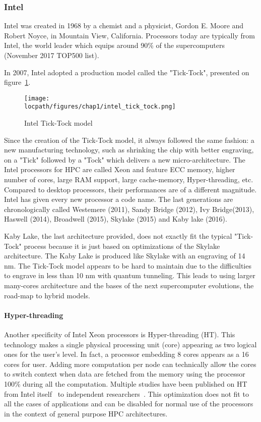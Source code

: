 \subsubsection{Intel}
Intel was created in 1968 by a chemist and a physicist, Gordon E. Moore and Robert Noyce, in Mountain View, California. 
Processors today are typically from Intel, the world leader which equips around 90\% of the supercomputers (November 2017 TOP500 list).

In 2007, Intel adopted a production model called the "Tick-Tock", presented on figure~\ref{fig:1_HPC:intel_tick_tock}.
\begin{figure}[t!]
\begin{center}
\texttt{[image: \\locpath/figures/chap1/intel\_tick\_tock.png]}
\caption{Intel Tick-Tock model}
\label{fig:1_HPC:intel_tick_tock}
\end{center}
\end{figure}
Since the creation of the Tick-Tock model, it always followed the same fashion: a new manufacturing technology, such as shrinking the chip with better engraving, on a "Tick" followed by a "Tock" which delivers a new micro-architecture.
The Intel processors for HPC are called Xeon and feature ECC memory, higher number of cores, large RAM support, large cache-memory, Hyper-threading, etc. 
Compared to desktop processors, their performances are of a different magnitude.
Intel has given every new processor a code name. 
The last generations are chronologically called Westemere (2011), Sandy Bridge (2012), Ivy Bridge(2013), Haswell (2014), Broadwell (2015), Skylake (2015) and Kaby lake (2016). 

Kaby Lake, the last architecture provided, does not exactly fit the typical "Tick-Tock" process because it is just based on optimizations of the Skylake architecture. 
The Kaby Lake is produced like Skylake with an engraving of 14 nm.
The Tick-Tock model appears to be hard to maintain due to the difficulties to engrave in less than 10 nm with quantum tunneling. 
This leads to using larger many-cores architecture and the bases of the next supercomputer evolutions, the road-map to hybrid models. 

\paragraph{Hyper-threading}
Another specificity of Intel Xeon processors is Hyper-threading (HT). 
This technology makes a single physical processing unit (core) appearing as two logical ones for the user's level.
In fact, a processor embedding 8 cores appears as a 16 cores for user. 
Adding more computation per node can technically allow the cores to switch context when data are fetched from the memory using the processor 100\% during all the computation. 
Multiple studies have been published on HT from Intel itself~\cite{marr2002hyperthreading} to independent researchers~\cite{bononi2006exploring,leng2002empirical}.
This optimization does not fit to all the cases of applications and can be disabled for normal use of the processors in the context of general purpose HPC architectures.

